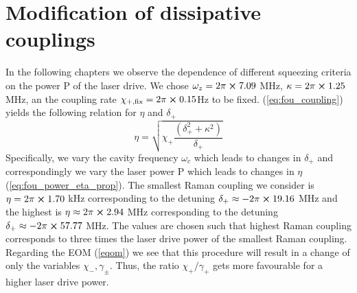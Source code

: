 \section{Modification of dissipative couplings}
In the following chapters we observe the dependence of different squeezing criteria on the power P of the laser drive. We chose $\omega_z = 2 \pi \cross 7.09$ MHz, $\kappa = 2 \pi \cross 1.25$ MHz, an the coupling rate $\chi_{+,\text{fix}} = 2\pi \cross 0.15$Hz to be fixed. (\ref{eq:fou_coupling}) yields the following relation for $\eta$ and $\delta_+$
\begin{equation}
	\eta = \sqrt{\chi_+ \frac{(\delta_+^2+\kappa^2)}{\delta_+}}
\end{equation}
Specifically, we vary the cavity frequency $\omega_c$ which leads to changes in $\delta_+$ and correspondingly we vary the laser power P which leads to changes in $\eta$ (\ref{eq:fou_power_eta_prop}). The smallest Raman coupling we consider is $\eta = 2 \pi \cross 1.70$ kHz corresponding to the detuning $\delta_+ \approx - 2 \pi \cross 19.16$ MHz %
 and the highest is $\eta \approx 2 \pi \cross 2.94$ MHz corresponding to the detuning $\delta_+ \approx - 2 \pi \cross 57.77$ MHz. The values are chosen such that highest Raman coupling corresponds to three times the laser drive power of the smallest Raman coupling. 
 \\
 Regarding the EOM (\ref{eqom}) we see that this procedure will result in a change of only the variables $\chi_-, \gamma_\pm$. 
Thus, the ratio $\chi_+ / \gamma_+$ gets more favourable for a higher laser drive power.  